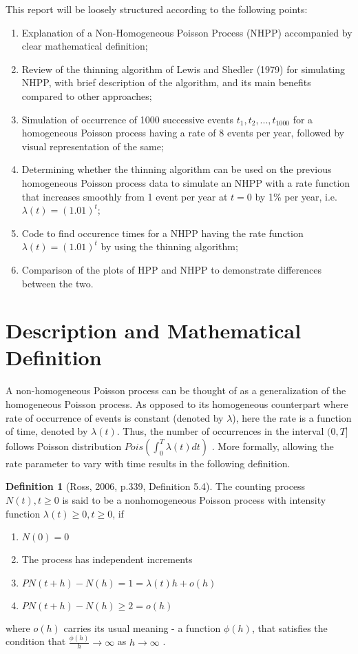\documentclass[%
 reprint,
 amsmath,amssymb,
 aps,
]{revtex4-2}
\theoremstyle{definition}
\newtheorem{definition}{Definition}[section]
\begin{document}
This report will be loosely structured according to the following points:
\begin{enumerate}
\item Explanation of a Non-Homogeneous Poisson Process (NHPP) accompanied by clear mathematical definition;
\item Review of the thinning algorithm of Lewis and Shedler (1979) \cite{lewis_shedler_1979} for simulating NHPP, with brief description of the algorithm, and its main benefits compared to other approaches;
\item Simulation of occurrence of 1000 successive events ${t_1, t_2, . . . , t_{1000}}$ for a homogeneous Poisson process having a rate of 8 events per year, followed by visual representation of the same;

\item Determining whether the thinning algorithm can be used on the previous homogeneous Poisson process data to simulate an NHPP with a rate function that increases smoothly from 1 event per year at $t = 0$ by 1\% per year, i.e. $\lambda(t) = (1.01)^t$;
\item Code to find occurence times for a NHPP having the rate function $\lambda(t) = (1.01)^t$ by using the thinning algorithm;
\item Comparison of the plots of HPP and NHPP to demonstrate differences between the two.

\end{enumerate}

\section{\label{q:1}Description and Mathematical Definition}
A non-homogeneous Poisson process can be thought of as a generalization of the homogeneous Poisson process. As opposed to its homogeneous counterpart where rate of occurrence of events is constant (denoted by $\lambda$), here the rate is a function of time, denoted by $\lambda(t)$. Thus, the number of occurrences in the interval $(0,T]$ follows Poisson distribution $Pois(\int_{0}^{T}\lambda(t)dt)$ \cite{chen}. More formally, allowing the rate parameter to vary with time results in the following definition.
\begin{definition}[Ross, 2006, p.339, Definition 5.4] \cite{Ross_2006} The counting process ${N(t), t \ge 0}$ is said to be a nonhomogeneous Poisson process with intensity function $\lambda(t) \ge 0, t \ge 0$, if
\begin{enumerate}
\item $N(0) = 0$
\item The process has independent increments
\item $P{N(t + h) - N(h) = 1} = \lambda(t)h + o(h)$
\item $P{N(t + h) - N(h) \ge 2} = o(h)$
\end{enumerate}
where $o(h)$ carries its usual meaning - a function $\phi(h)$, that satisfies the condition that $\frac{\phi(h)}{h}\to\infty$ as $h\to\infty$ \cite{billingsley_1995}.
\end{definition}
\end{document}
